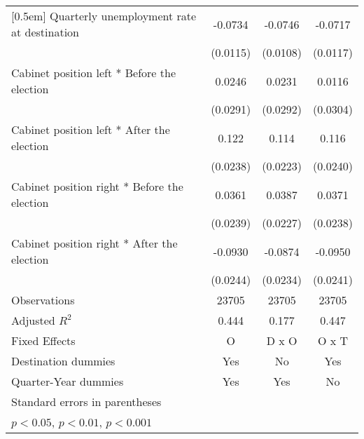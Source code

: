 \begin{table}[htbp]
\begin{tabular}{l*{3}{c}}
[0.5em]
Quarterly unemployment rate at destination&     -0.0734\sym{***}&     -0.0746\sym{***}&     -0.0717\sym{***}\\
                    &    (0.0115)         &    (0.0108)         &    (0.0117)         \\
[0.5em]
Cabinet position left * Before the election&      0.0246         &      0.0231         &      0.0116         \\
                    &    (0.0291)         &    (0.0292)         &    (0.0304)         \\
[0.5em]
Cabinet position left * After the election&       0.122\sym{***}&       0.114\sym{***}&       0.116\sym{***}\\
                    &    (0.0238)         &    (0.0223)         &    (0.0240)         \\
[0.5em]
Cabinet position right * Before the election&      0.0361         &      0.0387         &      0.0371         \\
                    &    (0.0239)         &    (0.0227)         &    (0.0238)         \\
[0.5em]
Cabinet position right * After the election&     -0.0930\sym{***}&     -0.0874\sym{***}&     -0.0950\sym{***}\\
                    &    (0.0244)         &    (0.0234)         &    (0.0241)         \\
\hline
Observations        &       23705         &       23705         &       23705         \\
Adjusted \(R^{2}\)  &       0.444         &       0.177         &       0.447         \\
Fixed Effects       &           O         &       D x O         &       O x T         \\
Destination dummies &         Yes         &          No         &         Yes         \\
Quarter-Year dummies&         Yes         &         Yes         &          No         \\
\hline\hline
\multicolumn{4}{l}{\footnotesize Standard errors in parentheses}\\
\multicolumn{4}{l}{\footnotesize \sym{*} \(p<0.05\), \sym{**} \(p<0.01\), \sym{***} \(p<0.001\)}\\
\end{tabular}
\end{table}
